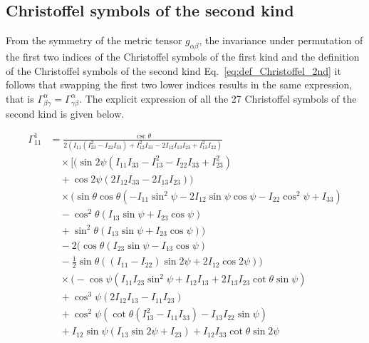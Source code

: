 \documentclass[pdflatex,sn-mathphys-num]{sn-jnl}%
\theoremstyle{thmstyleone}%
\theoremstyle{thmstyletwo}%
\theoremstyle{thmstylethree}%
\begin{document}
\begin{appendices}
\subsection{Christoffel symbols of the second kind}

From the symmetry of the metric tensor $g_{\alpha\beta}$, the invariance under permutation of the first two indices of the Christoffel symbols of the first kind and the definition of the Christoffel symbols of the second kind Eq.~\eqref{eq:def_Christoffel_2nd} it follows that swapping the first two lower indices results in the same expression, that is
${\Gamma^{\alpha}_{\beta\gamma} = \Gamma^{\alpha}_{\gamma\beta} }$.
The explicit expression of all the 27 Christoffel symbols of the second kind is given below.

\allowdisplaybreaks
\begin{align}
    \Gamma^{1}_{11} &= \frac{\csc \theta}{2 \left(I_{11} \left(I_{23}^2-I_{22} I_{33}\right)+I_{12}^2 I_{33}-2 I_{12} I_{13} I_{23}+I_{13}^2 I_{22}\right)} \nonumber \\
    &\quad \times \bigg[ \Big(\sin 2\psi \left(I_{11} I_{33}-I_{13}^2-I_{22} I_{33}+I_{23}^2\right) \nonumber \\
    &\quad + \cos 2\psi (2 I_{12} I_{33}-2 I_{13} I_{23})\Big) \nonumber \\
    &\quad \times \bigg(\sin \theta \cos \theta \left(-I_{11} \sin ^2\psi-2 I_{12} \sin \psi \cos \psi-I_{22} \cos ^2\psi+I_{33}\right) \nonumber \\
    &\quad -\cos ^2\theta (I_{13} \sin \psi+I_{23} \cos \psi) \nonumber \\
    &\quad +\sin ^2\theta (I_{13} \sin \psi+I_{23} \cos \psi)\bigg) \nonumber \\
    &\quad -2 \bigg(\cos \theta (I_{23} \sin \psi-I_{13} \cos \psi) \nonumber \\
    &\quad -\frac{1}{2} \sin \theta ((I_{11}-I_{22}) \sin 2\psi+2 I_{12} \cos 2\psi)\bigg) \nonumber \\
    &\quad \times \bigg(-\cos \psi \left(I_{11} I_{23} \sin ^2\psi+I_{12} I_{13}+2 I_{13} I_{23} \cot \theta \sin \psi\right) \nonumber \\
    &\quad +\cos ^3\psi (2 I_{12} I_{13}-I_{11} I_{23}) \nonumber \\
    &\quad +\cos ^2\psi \left(\cot \theta \left(I_{13}^2-I_{11} I_{33}\right)-I_{13} I_{22} \sin \psi\right) \nonumber \\
    &\quad +I_{12} \sin \psi (I_{13} \sin 2\psi+I_{23}) +I_{12} I_{33} \cot \theta \sin 2\psi \nonumber \\

\end{align}
\end{appendices}
\end{document}
